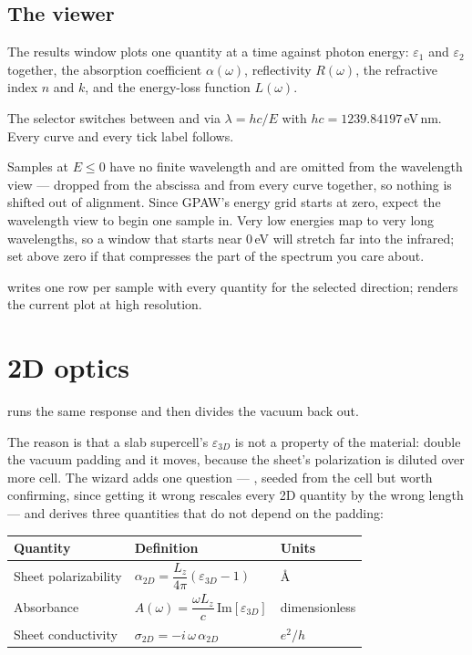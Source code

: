 \subsection{The viewer}

The results window plots one quantity at a time against photon energy:
$\varepsilon_1$ and $\varepsilon_2$ together, the absorption coefficient
$\alpha(\omega)$, reflectivity $R(\omega)$, the refractive index $n$ and $k$,
and the energy-loss function $L(\omega)$.

The  selector switches between  and
 via $\lambda = hc/E$ with $hc = 1239.84197$\,eV\,nm. Every
curve and every tick label follows.

\begin{calnote}
Samples at $E \le 0$ have no finite wavelength and are omitted from the
wavelength view --- dropped from the abscissa and from every curve together, so
nothing is shifted out of alignment. Since GPAW's energy grid starts at zero,
expect the wavelength view to begin one sample in. Very low energies map to
very long wavelengths, so a window that starts near 0\,eV will stretch far into
the infrared; set  above zero if that compresses the part
of the spectrum you care about.
\end{calnote}

 writes one row per sample with every quantity for the
selected direction;  renders the current plot at high
resolution.

\section{2D optics}
\label{sec:optics-2d}

\menusep{}\menusep{} runs the
same response and then divides the vacuum back out.

The reason is that a slab supercell's $\varepsilon_{3D}$ is not a property of
the material: double the vacuum padding and it moves, because the sheet's
polarization is diluted over more cell. The wizard adds one question ---
, seeded from the cell but worth confirming, since getting it
wrong rescales every 2D quantity by the wrong length --- and derives three
quantities that do not depend on the padding:

\begin{center}
\small
\begin{tabular}{@{}llp{6.2cm}@{}}
\toprule
Quantity & Definition & Units \\
\midrule
Sheet polarizability & $\alpha_{2D} = \dfrac{L_z}{4\pi}(\varepsilon_{3D} - 1)$
  & \AA{} \\[6pt]
Absorbance & $A(\omega) = \dfrac{\omega L_z}{c}\,\mathrm{Im}[\varepsilon_{3D}]$
  & dimensionless \\[6pt]
Sheet conductivity & $\sigma_{2D} = -i\,\omega\,\alpha_{2D}$
  & $e^2/h$ \\
\bottomrule
\end{tabular}
\end{center}


